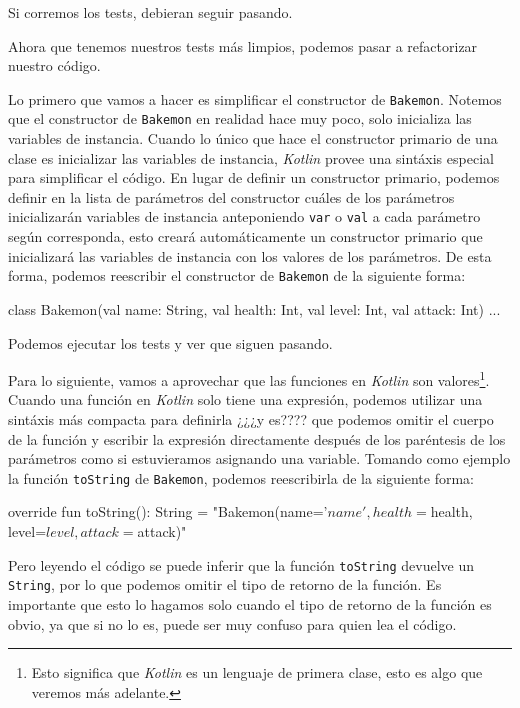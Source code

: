   Si corremos los tests, debieran seguir pasando.

  Ahora que tenemos nuestros tests más limpios, podemos pasar a refactorizar nuestro código.

  Lo primero que vamos a hacer es simplificar el constructor de \texttt{Bakemon}.
  Notemos que el constructor de \texttt{Bakemon} en realidad hace muy poco, solo inicializa las
  variables de instancia.
  Cuando lo único que hace el constructor primario de una clase es 
  inicializar las variables de instancia, \textit{Kotlin} provee una sintáxis especial para 
  simplificar el código.
  En lugar de definir un constructor primario, podemos definir en la lista de parámetros del
  constructor cuáles de los parámetros inicializarán variables de instancia anteponiendo 
  \texttt{var} o \texttt{val} a cada parámetro según corresponda, esto creará automáticamente
  un constructor primario que inicializará las variables de instancia con los valores de los
  parámetros.
  De esta forma, podemos reescribir el constructor de \texttt{Bakemon} de la siguiente forma:

  \begin{kotlin}
    class Bakemon(val name: String, val health: Int, val level: Int, val attack: Int) {...}
  \end{kotlin}

  Podemos ejecutar los tests y ver que siguen pasando.

  Para lo siguiente, vamos a aprovechar que las funciones en \textit{Kotlin} son valores\footnote{
    Esto significa que \textit{Kotlin} es un lenguaje de primera clase, esto es algo que veremos
    más adelante.
  }.
  Cuando una función en \textit{Kotlin} solo tiene una expresión, podemos utilizar una sintáxis más
  compacta para definirla ¿¿¿y es???? que podemos omitir el cuerpo de la función y escribir la expresión
  directamente después de los paréntesis de los parámetros como si estuvieramos asignando una 
  variable.
  Tomando como ejemplo la función \texttt{toString} de \texttt{Bakemon}, podemos reescribirla de la
  siguiente forma:

  \begin{kotlin}
    override fun toString(): String =
      "Bakemon(name='$name', health=$health, level=$level, attack=$attack)"
  \end{kotlin}

  Pero leyendo el código se puede inferir que la función \texttt{toString} devuelve un 
  \texttt{String}, por lo que podemos omitir el tipo de retorno de la función.
  Es importante que esto lo hagamos solo cuando el tipo de retorno de la función es obvio, ya que si
  no lo es, puede ser muy confuso para quien lea el código.

